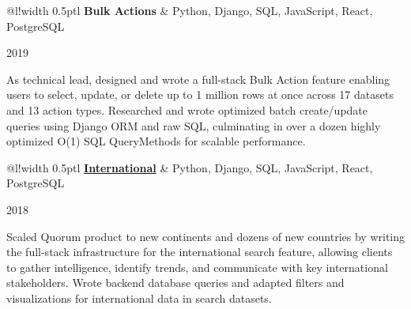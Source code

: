 \documentclass[]{article}
\newcommand\VRule{\color{lightgray}\vrule width 0.5pt}
\begin{document}

\begin{tabular}{@{}l!{\VRule}l}
	{\bf Bulk Actions} & Python, Django, SQL, JavaScript, React, PostgreSQL\\
\end{tabular}\hfill{\footnotesize 2019}

As technical lead, designed and wrote a full-stack Bulk Action feature enabling users to select, update, or delete up to 1 million rows at once across 17 datasets and 13 action types. Researched and wrote optimized batch create/update queries using Django ORM and raw SQL, culminating in over a dozen highly optimized O(1) SQL QueryMethods for scalable performance.\\

\begin{tabular}{@{}l!{\VRule}l}
	{\bf \href{https://www.quorum.us/products/international/}{International}} & Python, Django, SQL, JavaScript, React, PostgreSQL\\
\end{tabular}\hfill{\footnotesize 2018}

Scaled Quorum product to new continents and dozens of new countries by writing the full-stack infrastructure for the international search feature, allowing clients to gather intelligence, identify trends, and communicate with key international stakeholders. Wrote backend database queries and adapted filters and visualizations for international data in search datasets.\\
\end{document}
